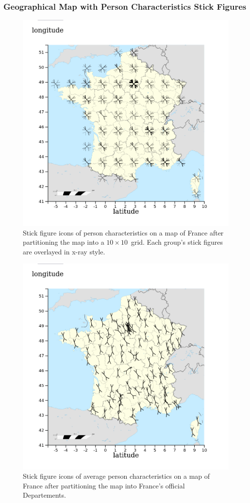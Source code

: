 \subsubsection{Geographical Map with Person Characteristics Stick Figures}
\begin{figure}
    \centering
    \includegraphics[width=0.6\linewidth]{figures/stick-figures-by-grid-10-10-xray.png}
    \caption{Stick figure icons of person characteristics on a map of France after partitioning the map into a \(10 \times 10\)~grid. Each group's stick figures are overlayed in x-ray style.}
    \label{figure-stick-figures-grid-xray}
\end{figure}
\begin{figure}
    \centering
    \includegraphics[width=0.6\linewidth]{figures/stick-figures-by-department-average.png}
    \caption{Stick figure icons of average person characteristics on a map of France after partitioning the map into France's official Departements.}
    \label{figure-stick-figures-departments-average}
\end{figure}
